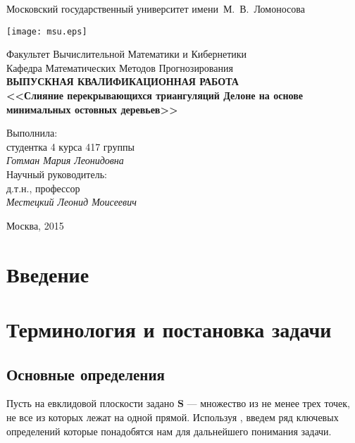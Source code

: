 \documentclass[12pt]{article}
\begin{document}
\begin{titlepage}
\begin{center}

	Московский государственный университет имени~М.~В.~Ломоносова

	\bigskip

	\texttt{[image: msu.eps]}
	
	\bigskip

	Факультет Вычислительной Математики и Кибернетики\\
	Кафедра Математических Методов Прогнозирования\\[10mm]

	\textsf{\large\bfseries
		ВЫПУСКНАЯ КВАЛИФИКАЦИОННАЯ РАБОТА\\[10mm]
		<<Слияние перекрывающихся триангуляций Делоне на основе минимальных остовных деревьев>>
	}\\[10mm]
	
	\begin{flushright}
		\parbox{0.5\textwidth}{
		Выполнила:\\
		студентка 4 курса 417 группы\\
		\emph{Готман Мария Леонидовна}\\[5mm]	
		Научный руководитель:\\
		д.т.н., профессор\\
		\emph{Местецкий Леонид Моисеевич}\\[5mm]
		}
	\end{flushright}

	\vspace{\fill}
	Москва, 2015
\end{center}
\end{titlepage}

\newpage

\tableofcontents

\newpage
\begin{abstract}

\end{abstract}

\newpage
\section{Введение}

\section{Терминология и постановка задачи}

\subsection{Основные определения}
Пусть на евклидовой плоскости задано $\textbf{S}$ --- множество из не менее трех точек, не все из которых лежат на одной прямой.
Используя  \cite[стр.~7-8]{Skvortsov}, \cite{MestOverlap} введем ряд ключевых определений которые понадобятся нам для дальнейшего понимания задачи.
\end{document}
